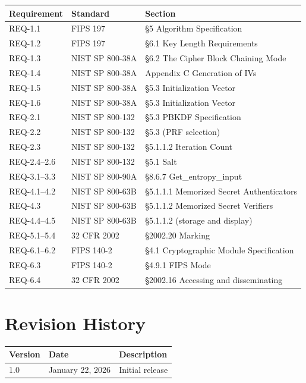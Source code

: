 \documentclass[11pt,letterpaper]{article}
\begin{document}
\begin{tabularx}{\textwidth}{llX}
\toprule
\textbf{Requirement} & \textbf{Standard} & \textbf{Section} \\
\midrule
REQ-1.1 & FIPS 197 & \S5 Algorithm Specification \\
REQ-1.2 & FIPS 197 & \S6.1 Key Length Requirements \\
REQ-1.3 & NIST SP 800-38A & \S6.2 The Cipher Block Chaining Mode \\
REQ-1.4 & NIST SP 800-38A & Appendix C Generation of IVs \\
REQ-1.5 & NIST SP 800-38A & \S5.3 Initialization Vector \\
REQ-1.6 & NIST SP 800-38A & \S5.3 Initialization Vector \\
REQ-2.1 & NIST SP 800-132 & \S5.3 PBKDF Specification \\
REQ-2.2 & NIST SP 800-132 & \S5.3 (PRF selection) \\
REQ-2.3 & NIST SP 800-132 & \S5.1.1.2 Iteration Count \\
REQ-2.4--2.6 & NIST SP 800-132 & \S5.1 Salt \\
REQ-3.1--3.3 & NIST SP 800-90A & \S8.6.7 Get\_entropy\_input \\
REQ-4.1--4.2 & NIST SP 800-63B & \S5.1.1.1 Memorized Secret Authenticators \\
REQ-4.3 & NIST SP 800-63B & \S5.1.1.2 Memorized Secret Verifiers \\
REQ-4.4--4.5 & NIST SP 800-63B & \S5.1.1.2 (storage and display) \\
REQ-5.1--5.4 & 32 CFR 2002 & \S2002.20 Marking \\
REQ-6.1--6.2 & FIPS 140-2 & \S4.1 Cryptographic Module Specification \\
REQ-6.3 & FIPS 140-2 & \S4.9.1 FIPS Mode \\
REQ-6.4 & 32 CFR 2002 & \S2002.16 Accessing and disseminating \\
\bottomrule
\end{tabularx}

\section{Revision History}

\begin{tabularx}{\textwidth}{llX}
\toprule
\textbf{Version} & \textbf{Date} & \textbf{Description} \\
\midrule
1.0 & January 22, 2026 & Initial release \\
\bottomrule
\end{tabularx}
\end{document}
